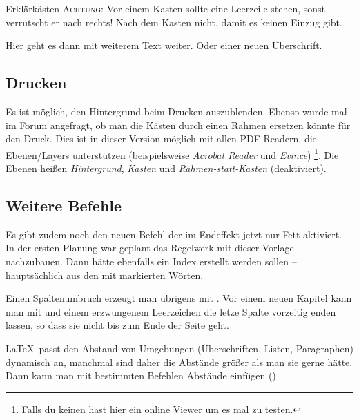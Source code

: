 \begin{multicols}{2}[        %
		]
\begin{kasten}{4.8cm}{Erklärkästen}
	\textsc{Achtung:} Vor einem Kasten sollte eine Leerzeile stehen, sonst verrutscht er nach rechts! Nach dem Kasten nicht, damit es keinen Einzug gibt.
\end{kasten}
% 
Hier geht es dann mit weiterem Text weiter. Oder einer neuen Überschrift.

\subsection{Drucken}
Es ist möglich, den Hintergrund beim Drucken auszublenden.
Ebenso wurde mal im Forum angefragt, ob man die Kästen durch einen Rahmen ersetzen könnte für den Druck.
Dies ist in dieser Version möglich mit allen PDF-Readern, die Ebenen/Layers unterstützen (beispielsweise \emph{Acrobat Reader} und \emph{Evince})
\footnote{Falls du keinen hast hier ein \href{https://www.pdftron.com/webviewer/demo}{online Viewer} um es mal zu testen.}.
Die Ebenen heißen \emph{Hintergrund}, \emph{Kasten} und \emph{Rahmen-statt-Kasten} (deaktiviert).


\clearpage %

 
\subsection{Weitere Befehle}

Es gibt zudem noch den neuen Befehl  der im Endeffekt jetzt nur Fett aktiviert. In der ersten Planung war geplant das Regelwerk mit dieser Vorlage nachzubauen. Dann hätte ebenfalls ein Index erstellt werden sollen – hauptsächlich aus den mit  markierten Wörten.

Einen Spaltenumbruch erzeugt man übrigens mit . Vor einem neuen Kapitel kann man mit  und einem erzwungenem Leerzeichen die letze Spalte vorzeitig enden lassen, so dass sie nicht bis zum Ende der Seite geht. 

\LaTeX\ passt den Abstand von Umgebungen (Überschriften, Listen, Paragraphen) dynamisch an, manchmal sind daher die Abstände größer als man sie gerne hätte. Dann kann man mit bestimmten Befehlen Abstände einfügen ()


\end{multicols}
